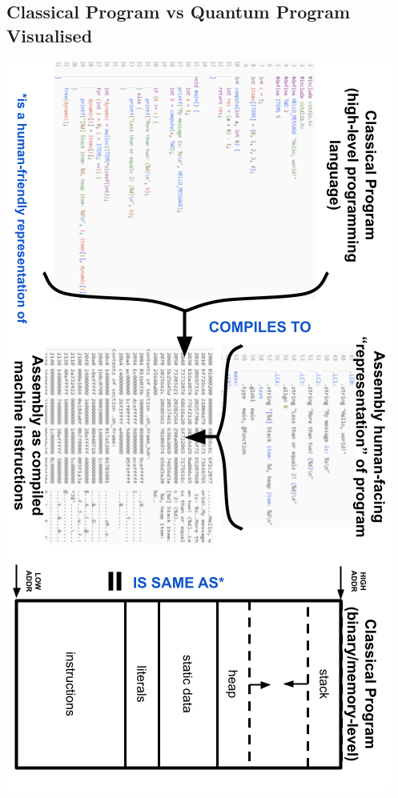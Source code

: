\documentclass[conference]{IEEEtran}
\begin{document}
\begin{appendices}
\subsection{Classical Program vs Quantum Program Visualised}
\label{appendix:ClassicalProgramVsQuantumProgram}

\begin{strip} %
\centerline{
    \includegraphics[width=0.625\linewidth]{img/classical_algorithm_visualised.png}
}
\label{fig:classicalAlgorithmVisualised}
\end{strip}

\clearpage


\end{appendices}
\end{document}

